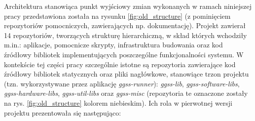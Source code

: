Architektura stanowiąca punkt wyjściowy zmian wykonanych w ramach niniejszej pracy przedstawiona została na rysunku \ref{fig:old_structure} (z pominięciem repozytoriów pomocniczych, zawierających np. dokumentację). Projekt zawierał 14 repozytoriów, tworzących strukturę hierarchiczną, w skład których wchodziły m.in.: aplikacje, pomocnicze skrypty, infrastruktura budowania oraz kod źródłowy bibliotek implementujących poszczególne funkcjonalności systemu. W kontekście tej części pracy szczególnie istotne są repozytoria zawierające kod źródłowy bibliotek statycznych oraz pliki nagłówkowe, stanowiące trzon projektu (tzn. wykorzystywane przez aplikację \emph{ggss-runner}): \emph{ggss-lib}, \emph{ggss-software-libs}, \emph{ggss-hardware-libs}, \emph{ggss-util-libs} oraz \emph{ggss-misc} (repozytoria te oznaczone zostały na rys. \ref{fig:old_structure} kolorem niebieskim). Ich rola w pierwotnej wersji projektu prezentowała się następująco:

